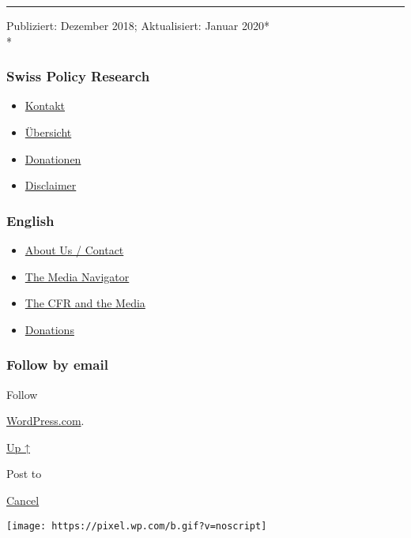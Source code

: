\begin{center}\rule{0.5\linewidth}{\linethickness}\end{center}

Publiziert: Dezember 2018; Aktualisiert: Januar 2020*\\
*

\hypertarget{swiss-policy-research}{%
\subsubsection{Swiss Policy Research}\label{swiss-policy-research}}

\begin{itemize}
\tightlist
\item
  \href{https://swprs.org/kontakt/}{Kontakt}
\item
  \href{https://swprs.org/uebersicht/}{Übersicht}
\item
  \href{https://swprs.org/donationen/}{Donationen}
\item
  \href{https://swprs.org/disclaimer/}{Disclaimer}
\end{itemize}

\hypertarget{english}{%
\subsubsection{English}\label{english}}

\begin{itemize}
\tightlist
\item
  \href{https://swprs.org/contact/}{About Us / Contact}
\item
  \href{https://swprs.org/media-navigator/}{The Media Navigator}
\item
  \href{https://swprs.org/the-american-empire-and-its-media/}{The CFR
  and the Media}
\item
  \href{https://swprs.org/donations/}{Donations}
\end{itemize}

\hypertarget{follow-by-email}{%
\subsubsection{Follow by email}\label{follow-by-email}}

Follow

\href{https://wordpress.com/?ref=footer_custom_com}{WordPress.com}.

\protect\hyperlink{}{Up ↑}

Post to

\protect\hyperlink{}{Cancel}

\texttt{[image: https://pixel.wp.com/b.gif?v=noscript]}
